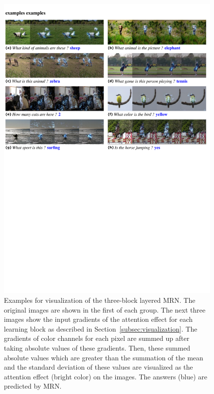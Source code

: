 \documentclass{article}
\begin{document}
\begin{figure}[t!]
\centering
\includegraphics[width=\linewidth]{mrn_examples_reduced}
\caption{Examples for visualization of the three-block layered MRN. The original images are shown in the first of each group. The next three images show the input gradients of the attention effect for each learning block as described in Section~\ref{subsec:visualization}. The gradients of color channels for each pixel are summed up after taking absolute values of these gradients. Then, these summed absolute values which are greater than the summation of the mean and the standard deviation of these values are visualized as the attention effect (bright color) on the images. The answers (blue) are predicted by MRN.}
\label{fig:examples}
\end{figure} 
\end{document}
